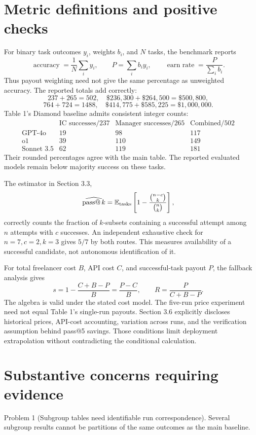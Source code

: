 \documentclass[10pt]{article}
\begin{document}
\section*{Metric definitions and positive checks}
For binary task outcomes \(y_i\), weights \(b_i\), and \(N\) tasks, the benchmark reports \[\operatorname{accuracy}=\frac1N\sum_i y_i,\qquad
 P=\sum_i b_i y_i,\qquad
 \operatorname{earn\ rate}=\frac{P}{\sum_i b_i}.\] Thus payout weighting need not give the same percentage as unweighted accuracy. The reported totals add correctly: \[237+265=502,\quad \$236{,}300+\$264{,}500=\$500{,}800,\] \[764+724=1488,\quad \$414{,}775+\$585{,}225=\$1{,}000{,}000.\] Table 1’s Diamond baseline admits consistent integer counts: \[\begin{array}{c|rrr}
 &\text{IC successes}/237&\text{Manager successes}/265&\text{Combined}/502\\\hline
 \text{GPT-4o}&19&98&117\\
 \text{o1}&39&110&149\\
 \text{Sonnet 3.5}&62&119&181
\end{array}\] Their rounded percentages agree with the main table. The reported evaluated models remain below majority success on these tasks.\par
The estimator in Section 3.3, \[\widehat{\operatorname{pass@}k}
 =\mathbb E_{\rm tasks}\left[1-\frac{\binom{n-c}{k}}{\binom nk}\right],\] correctly counts the fraction of \(k\)-subsets containing a successful attempt among \(n\) attempts with \(c\) successes. An independent exhaustive check for \(n=7,c=2,k=3\) gives \(5/7\) by both routes. This measures availability of a successful candidate, not autonomous identification of it.\par
For total freelancer cost \(B\), API cost \(C\), and successful-task payout \(P\), the fallback analysis gives \[s=1-\frac{C+B-P}{B}=\frac{P-C}{B},\qquad
 R=\frac{P}{C+B-P}.\] The algebra is valid under the stated cost model. The five-run price experiment need not equal Table 1’s single-run payouts. Section 3.6 explicitly discloses historical prices, API-cost accounting, variation across runs, and the verification assumption behind pass@5 savings. Those conditions limit deployment extrapolation without contradicting the conditional calculation.\par
\section*{Substantive concerns requiring evidence}
Problem 1 (Subgroup tables need identifiable run correspondence).  Several subgroup results cannot be partitions of the same outcomes as the main baseline.\par
\end{document}
